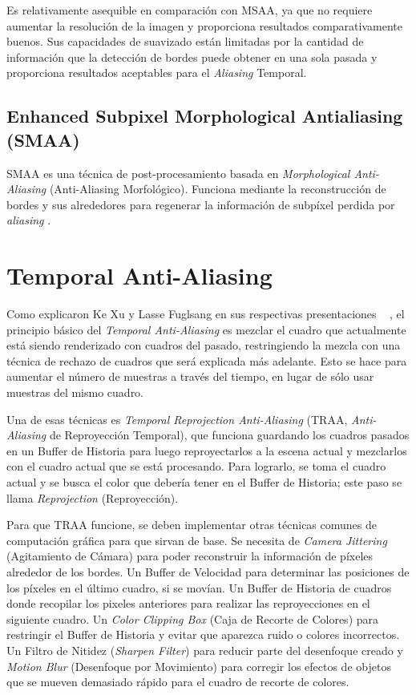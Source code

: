 \documentclass[pregrado]{tesis-usb} %
\begin{document}
Es relativamente asequible en comparación con MSAA, ya que no requiere aumentar la resolución de la imagen y proporciona resultados comparativamente buenos. Sus capacidades de suavizado están limitadas por la cantidad de información que la detección de bordes puede obtener en una sola pasada y proporciona resultados aceptables para el \textit{Aliasing} Temporal.

\subsection{Enhanced Subpixel Morphological Antialiasing (SMAA)}
SMAA es una técnica de post-procesamiento basada en \textit{Morphological Anti-Aliasing} (Anti-Aliasing Morfológico). Funciona mediante la reconstrucción de bordes y sus alrededores para regenerar la información de subpíxel perdida por \textit{aliasing} \cite{Jimenez2012}.

\section{Temporal Anti-Aliasing}
Como explicaron Ke Xu y Lasse Fuglsang en sus respectivas presentaciones ~ \cite{XU2016, Fuglsand2016}, el principio básico del \textit{Temporal Anti-Aliasing} es mezclar el cuadro que actualmente está siendo renderizado con cuadros del pasado, restringiendo la mezcla con una técnica de rechazo de cuadros que será explicada más adelante. Esto se hace para aumentar el número de muestras a través del tiempo, en lugar de sólo usar muestras del mismo cuadro.

Una de esas técnicas es \textit{Temporal Reprojection Anti-Aliasing}  (TRAA, \textit{Anti-Aliasing} de Reproyección Temporal), que funciona guardando los cuadros pasados en un Buffer de Historia para luego reproyectarlos a la escena actual y mezclarlos con el cuadro actual que se está procesando. Para lograrlo, se toma el cuadro actual y se busca el color que debería tener en el Buffer de Historia; este paso se llama \textit{Reprojection} (Reproyección).

Para que TRAA funcione, se deben implementar otras técnicas comunes de computación gráfica para que sirvan de base. Se necesita de \textit{Camera Jittering} (Agitamiento de Cámara) para poder reconstruir la información de píxeles alrededor de los bordes. Un Buffer de Velocidad para determinar las posiciones de los píxeles en el último cuadro, si se movían. Un Buffer de Historia de cuadros donde recopilar los pixeles anteriores para realizar las reproyecciones en el siguiente cuadro. Un \textit{Color Clipping Box} (Caja de Recorte de Colores) para restringir el Buffer de Historia y evitar que aparezca ruido o colores incorrectos. Un Filtro de Nitidez (\textit{Sharpen Filter}) para reducir parte del desenfoque creado y \textit{Motion Blur} (Desenfoque por Movimiento) para corregir los efectos de objetos que se mueven demasiado rápido para el cuadro de recorte de colores.
\end{document}
